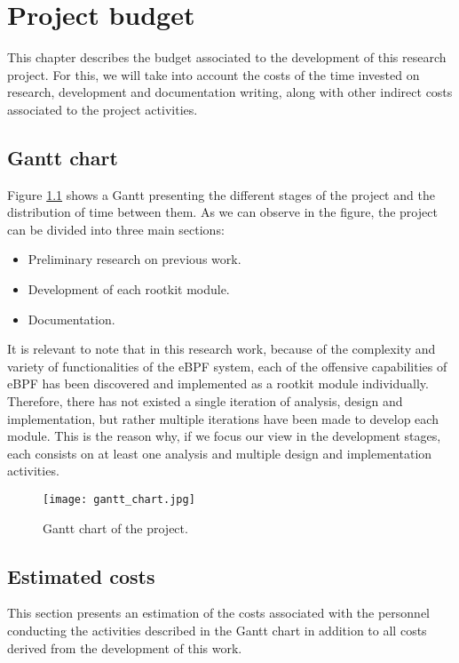 \chapter{Project budget}
This chapter describes the budget associated to the development of this
research project. For this, we will take into account the costs of the time
invested on research, development and documentation writing, along with
other indirect costs associated to the project activities.

\section{Gantt chart}
Figure \ref{fig:gantt_chart} shows a Gantt presenting the different stages of the project and the distribution of time between them. As we can observe in the figure, the project can be divided into three main sections:
\begin{itemize}
\item Preliminary research on previous work.
\item Development of each rootkit module.
\item Documentation.
\end{itemize}

It is relevant to note that in this research work, because of the complexity and variety of functionalities of the eBPF system, each of the offensive capabilities of eBPF has been discovered and implemented as a rootkit module individually. Therefore, there has not existed a single iteration of analysis, design and implementation, but rather multiple iterations have been made to develop each module. This is the reason why, if we focus our view in the development stages, each consists on at least one analysis and multiple design and implementation activities.

\thispagestyle{lscape}
\begin{landscape}
\begin{figure}[htbp]
	\centering
	\texttt{[image: gantt\_chart.jpg]}
	\caption{Gantt chart of the project.}
	\label{fig:gantt_chart}
\end{figure}
\end{landscape}
\restoregeometry

\section{Estimated costs}
This section presents an estimation of the costs associated with the  personnel conducting the activities described in the Gantt chart in addition to all costs derived from the development of this work.

